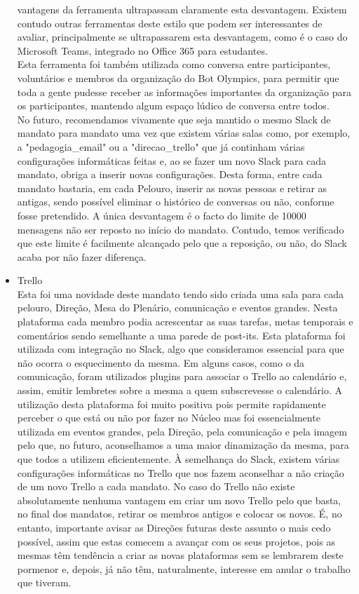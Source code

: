 \begin{itemize}
vantagens da ferramenta ultrapassam claramente esta desvantagem. Existem contudo outras ferramentas deste estilo que podem ser interessantes de avaliar, principalmente se ultrapassarem esta desvantagem, como é o caso do Microsoft Teams, integrado no Office 365 para estudantes.\\
Esta ferramenta foi também utilizada como conversa entre participantes, voluntários e membros da organização do Bot Olympics, para permitir que toda a gente pudesse receber as informações importantes da organização para os participantes, mantendo algum espaço lúdico de conversa entre todos.\\
No futuro, recomendamos vivamente que seja mantido o mesmo Slack de mandato para mandato uma vez que existem várias salas como, por exemplo, a "pedagogia\_email" ou a "direcao\_trello" que já continham várias configurações informáticas feitas e, ao se fazer um novo Slack para cada mandato, obriga a inserir novas configurações. Desta forma, entre cada mandato bastaria, em cada Pelouro, inserir as novas pessoas e retirar as antigas, sendo possível eliminar o histórico de conversas ou não, conforme fosse pretendido. A única desvantagem é o facto do limite de 10000 mensagens não ser reposto no início do mandato. Contudo, temos verificado que este limite é facilmente alcançado pelo que a reposição, ou não, do Slack acaba por não fazer diferença.

\item Trello\\
Esta foi uma novidade deste mandato tendo sido criada uma sala para cada pelouro, Direção, Mesa do Plenário, comunicação e eventos grandes. Nesta plataforma cada membro podia acrescentar as suas tarefas, metas temporais e comentários sendo semelhante a uma parede de post-its. Esta plataforma foi utilizada com integração no Slack, algo que consideramos essencial para que não ocorra o esquecimento da mesma. Em alguns casos, como o da comunicação, foram utilizados plugins para associar o Trello ao calendário e, assim, emitir lembretes sobre a mesma a quem subscrevesse o calendário. A utilização desta plataforma foi muito positiva pois permite rapidamente perceber o que está ou não por fazer no Núcleo mas foi essencialmente utilizada em eventos grandes, pela Direção, pela comunicação e pela imagem pelo que, no futuro, aconselhamos a uma maior dinamização da mesma, para que todos a utilizem eficientemente.
À semelhança do Slack, existem várias configurações informáticas no Trello que nos fazem aconselhar a não criação de um novo Trello a cada mandato. No caso do Trello não existe absolutamente nenhuma vantagem em criar um novo Trello pelo que basta, no final dos mandatos, retirar os membros antigos e colocar os novos. É, no entanto, importante avisar as Direções futuras deste assunto o mais cedo possível, assim que estas comecem a avançar com os seus projetos, pois as mesmas têm tendência a criar as novas plataformas sem se lembrarem deste pormenor e, depois, já não têm, naturalmente, interesse em anular o trabalho que tiveram.


\end{itemize}
